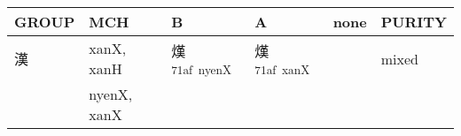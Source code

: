\documentclass[14pt,a4paper]{scrartcl}
\begin{document}
\begin{longtable}[c]{@{}llllll@{}}
\toprule
\begin{minipage}[b]{0.14\columnwidth}\raggedright\strut
GROUP
\strut\end{minipage} &
\begin{minipage}[b]{0.14\columnwidth}\raggedright\strut
MCH
\strut\end{minipage} &
\begin{minipage}[b]{0.14\columnwidth}\raggedright\strut
B
\strut\end{minipage} &
\begin{minipage}[b]{0.14\columnwidth}\raggedright\strut
A
\strut\end{minipage} &
\begin{minipage}[b]{0.14\columnwidth}\raggedright\strut
none
\strut\end{minipage} &
\begin{minipage}[b]{0.14\columnwidth}\raggedright\strut
PURITY
\strut\end{minipage}\tabularnewline
\midrule
\endhead
\begin{minipage}[t]{0.14\columnwidth}\raggedright\strut
漢
\strut\end{minipage} &
\begin{minipage}[t]{0.14\columnwidth}\raggedright\strut
xanX, xanH
\strut\end{minipage} &
\begin{minipage}[t]{0.14\columnwidth}\raggedright\strut
熯\textsuperscript{71af~nyenX}
\strut\end{minipage} &
\begin{minipage}[t]{0.14\columnwidth}\raggedright\strut
熯\textsuperscript{71af~xanX}
\strut\end{minipage} &
\begin{minipage}[t]{0.14\columnwidth}\raggedright\strut
\strut\end{minipage} &
\begin{minipage}[t]{0.14\columnwidth}\raggedright\strut
mixed
\strut\end{minipage}\tabularnewline
\begin{minipage}[t]{0.14\columnwidth}\raggedright\strut
𩁢
\strut\end{minipage} &
\begin{minipage}[t]{0.14\columnwidth}\raggedright\strut
nyenX, xanX
\strut\end{minipage} &
\begin{minipage}[t]{0.14\columnwidth}\raggedright\strut
\strut\end{minipage} &

\end{longtable}
\end{document}
